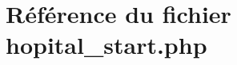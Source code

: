 \hypertarget{hopital__start_8php}{
\section{R\'{e}f\'{e}rence du fichier hopital\_\-start.php}
\label{hopital__start_8php}
}
